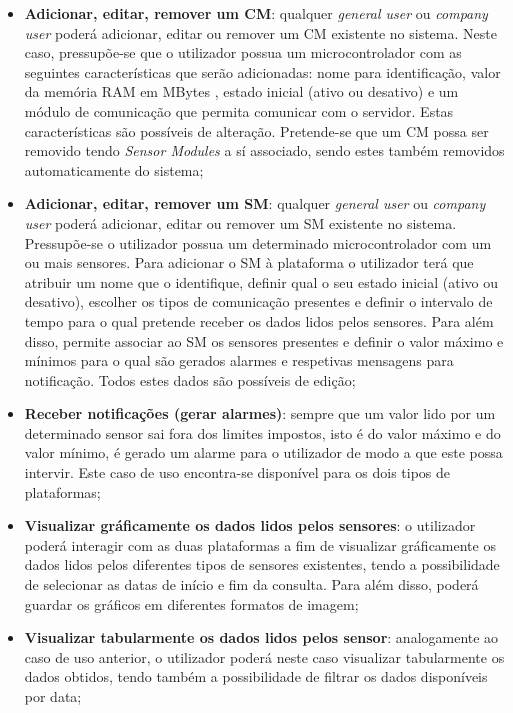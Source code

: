 \begin{itemize}
	
	\item \textbf{Adicionar, editar, remover um \acl{CM}}: qualquer \textit{general user} ou \textit{company user} poderá adicionar, editar ou remover um \acl{CM} existente no sistema. Neste caso, pressupõe-se que o utilizador possua um microcontrolador com as seguintes características que serão  adicionadas: nome para identificação, valor da memória \ac{RAM} em MBytes , estado inicial (ativo ou desativo) e um módulo de comunicação que permita comunicar com o servidor. Estas características são possíveis de  alteração. Pretende-se que um \acl{CM} possa ser removido tendo \textit{Sensor Modules} a sí associado, sendo estes também removidos automaticamente do sistema;


	\item \textbf{Adicionar, editar, remover um \acl{SM}}: qualquer \textit{general user} ou \textit{company user} poderá adicionar, editar ou remover um \acl{SM} existente no sistema. Pressupõe-se o utilizador possua um determinado microcontrolador com um ou mais sensores. Para adicionar o \acl{SM} à plataforma o utilizador terá que atribuir um nome que o identifique, definir qual o seu estado inicial (ativo ou desativo), escolher os tipos de comunicação presentes e definir o intervalo de tempo para o qual pretende receber os dados lidos pelos sensores. Para além disso, permite associar ao \acl{SM} os sensores presentes e definir o valor máximo e mínimos para o qual são gerados alarmes e respetivas mensagens para notificação. Todos estes dados são possíveis de edição; 
	

	
	\item \textbf{Receber notificações (gerar alarmes)}: sempre que um valor lido por um determinado sensor sai fora dos limites impostos, isto é do valor máximo e do valor mínimo, é gerado um alarme para o utilizador de modo a que este possa intervir. Este caso de uso encontra-se disponível para os dois tipos de plataformas;
	
	
	\item \textbf{Visualizar gráficamente os dados lidos pelos sensores}: o utilizador poderá interagir com as duas plataformas a fim de visualizar gráficamente os dados lidos pelos diferentes tipos de sensores existentes, tendo a possibilidade de selecionar as datas de início e fim da consulta. Para além disso, poderá guardar os gráficos em diferentes formatos de imagem;
	
	\item \textbf{Visualizar tabularmente os dados lidos pelos sensor}: analogamente ao caso de uso anterior, o utilizador poderá neste caso visualizar tabularmente os dados obtidos, tendo também a possibilidade de filtrar os dados disponíveis por data; 
	

\end{itemize}
